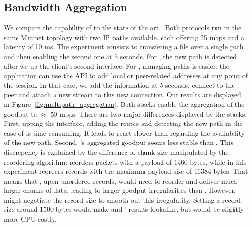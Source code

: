 

\subsection{Bandwidth Aggregation}

We compare the capability of \tcpls to the state of the art \mptcp. Both
protocols run in the same Mininet topology with two IP paths available, each
offering 25 mbps and a latency of 10 ms. The experiment consists to transfering
a file over a single path and then enabling the second one at $5$ seconds. For
\mptcp, the new path is detected after we up the client's second interface. For
\tcpls, managing paths is easier: the application can use the API to add local
or peer-related addresses at any point of the session. In that case, we add
the information at $5$ seconds, connect to the peer and attach a new stream to
this new connection. Our results are displayed in
Figure~\ref{fig:multipath_aggregation}. Both stacks enable the aggregation of the
goodput to  $\approx$ 50 mbps. There are two major differences displayed by the stacks.
First, upping the interface, adding the routes and detecting the new path in
the case of \mptcp is time consuming. It leads \mptcp to react slower than
\tcpls regarding the availability of the new path. Second, \tcpls's aggregated
goodput seems less stable than \mptcp. This discrepency is explained by the
difference of chunk size manipulated by the reordering algorithm: \mptcp
reorders packets with a payload of $1460$ bytes, while \tcpls in this experiment
reorders records with the maximum payload size of $16384$ bytes. That means
that \tcpls, upon unordered records, would need to reorder and deliver much
larger chunks of data, leading to larger goodput irregularities than \mptcp.
However, \tcpls might  negotiate the record size to smooth out this
irregularity. Setting a record size around $1500$ bytes would make \mptcp and
\tcpls' results lookalike, but would be slightly more CPU costly.

